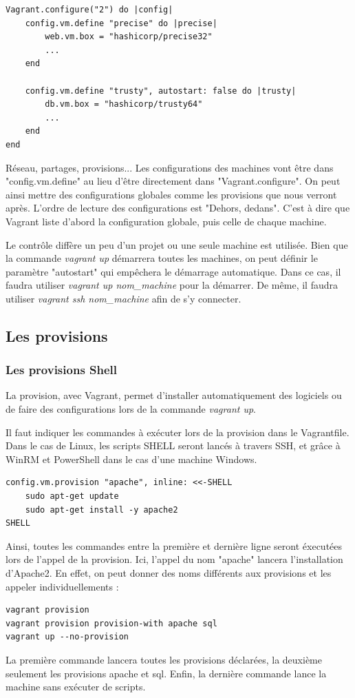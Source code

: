 \documentclass[12pt,a4paper]{article}
\begin{document}
\begin{lstlisting}
Vagrant.configure("2") do |config|
	config.vm.define "precise" do |precise|
		web.vm.box = "hashicorp/precise32"
		...
	end
	
	config.vm.define "trusty", autostart: false do |trusty|
		db.vm.box = "hashicorp/trusty64"
		...
	end
end
\end{lstlisting}
Réseau, partages, provisions... Les configurations des machines vont être dans "config.vm.define" au lieu d'être directement dans "Vagrant.configure". On peut ainsi mettre des configurations globales comme les provisions que nous verront après. L'ordre de lecture des configurations est "Dehors, dedans". C'est à dire que Vagrant liste d'abord la configuration globale, puis celle de chaque machine.

	Le contrôle diffère un peu d'un projet ou une seule machine est utilisée. Bien que la commande \textit{vagrant up} démarrera toutes les machines, on peut définir le paramètre "autostart" qui empêchera le démarrage automatique. Dans ce cas, il faudra utiliser \textit{vagrant up nom\_machine} pour la démarrer. De même, il faudra utiliser \textit{vagrant ssh nom\_machine} afin de s'y connecter.

\subsection{Les provisions}

\subsubsection{Les provisions Shell}
La provision, avec Vagrant, permet d'installer automatiquement des logiciels ou de faire des configurations lors de la commande \textit{vagrant up}. 

Il faut indiquer les commandes à exécuter lors de la provision dans le Vagrantfile. Dans le cas de Linux, les scripts SHELL seront lancés à travers SSH, et grâce à WinRM et PowerShell dans le cas d'une machine Windows.
\begin{lstlisting}
config.vm.provision "apache", inline: <<-SHELL
	sudo apt-get update
	sudo apt-get install -y apache2
SHELL
\end{lstlisting}
Ainsi, toutes les commandes entre la première et dernière ligne seront éxecutées lors de l'appel de la provision. Ici, l'appel du nom "apache" lancera l'installation d'Apache2. En effet, on peut donner des noms différents aux provisions et les appeler individuellements :
\begin{lstlisting}
vagrant provision
vagrant provision provision-with apache sql  
vagrant up --no-provision
\end{lstlisting}
La première commande lancera toutes les provisions déclarées, la deuxième seulement les provisions apache et sql. Enfin, la dernière commande lance la machine sans exécuter de scripts.
\end{document}
